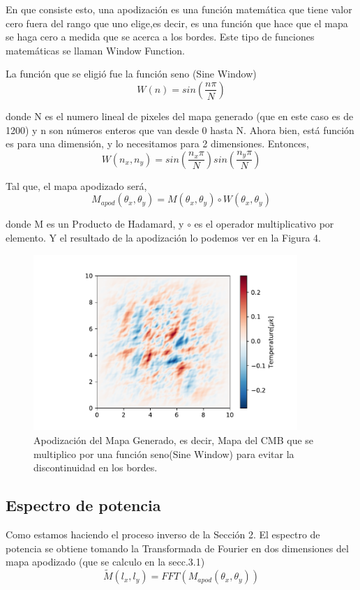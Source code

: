 \documentclass[a4paper]{article}
\begin{document}
En que consiste esto, una apodización es una función matemática que tiene valor cero fuera del rango que uno elige,es decir, es una función que hace que el mapa se haga cero a medida que se acerca a los bordes. Este tipo de funciones matemáticas se llaman Window Function.

La función que se eligió fue la función seno (Sine Window) 
\begin{equation}
    W(n)=sin\left ( \frac{n\pi}{N} \right )
\end{equation}

donde N es el numero lineal de pixeles del mapa generado (que en este caso es de 1200) y n son números enteros que van desde 0 hasta N.
Ahora bien, está función es para una dimensión, y  lo necesitamos para  2 dimensiones.
Entonces,
\begin{equation}
    W(n_x,n_y)=sin\left ( \frac{n_x \pi}{N} \right )sin\left ( \frac{n_y\pi}{N} \right )
\end{equation}

Tal que, el mapa apodizado será,
\begin{equation}
   M_{apod}(\theta_x,\theta_y)=M(\theta_x,\theta_y) \circ W(\theta_x,\theta_y)
\end{equation}

donde M es un Producto de Hadamard, y $\circ$ es el operador multiplicativo por elemento. Y el resultado de la apodización lo podemos ver en la Figura 4.

\begin{figure}
\includegraphics[width=10cm]{CMBapodafinal2.pdf}
\centering
\caption{Apodización del Mapa Generado, es decir, Mapa del CMB que se multiplico por una función seno(Sine Window) para evitar la discontinuidad en los bordes.}
\end{figure}

\subsection{Espectro de potencia}
Como estamos haciendo el proceso inverso de la Sección 2. El espectro de potencia se obtiene tomando la Transformada de Fourier en dos dimensiones del mapa apodizado (que se calculo en la secc.3.1) 
\begin{equation}
    \tilde{M}(l_x,l_y)=FFT(M_{apod}(\theta_x,\theta_y))
\end{equation}
\end{document}
